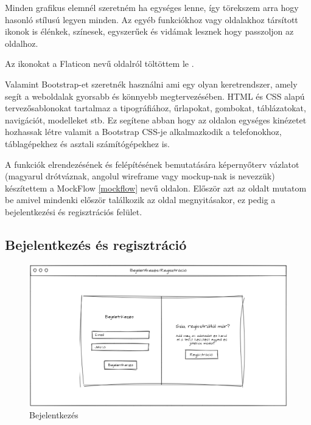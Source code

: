 Minden grafikus elemnél szeretném ha egységes lenne, így törekszem arra hogy hasonló stílusú legyen minden. Az egyéb funkciókhoz vagy oldalakhoz társított ikonok is élénkek, színesek, egyszerűek és vidámak lesznek hogy passzoljon az oldalhoz.

Az ikonokat a Flaticon nevű oldalról töltöttem le \cite{falcon}.

Valamint Bootstrap-et szeretnék használni ami egy olyan keretrendszer, amely segít a weboldalak gyorsabb és könnyebb megtervezésében. HTML és CSS alapú tervezősablonokat tartalmaz a tipográfiához, űrlapokat, gombokat, táblázatokat, navigációt, modelleket stb. Ez segítene abban hogy az oldalon egységes kinézetet hozhassak létre valamit a Bootstrap CSS-je alkalmazkodik a telefonokhoz, táblagépekhez és asztali számítógépekhez is.


A funkciók elrendezésének és felépítésének bemutatására képernyőterv vázlatot (magyarul drótváznak, angolul wireframe vagy mockup-nak is nevezzük) készítettem a MockFlow \ref{mockflow} nevű oldalon.
Először azt az oldalt mutatom be amivel mindenki először találkozik az oldal megnyitásakor, ez pedig a bejelentkezési és regisztrációs felület.

\subsection{Bejelentkezés és regisztráció}

\begin{figure}[H]
    \centering
    \includegraphics[width=\linewidth]{images/login_wireframe.png}
    \caption{Bejelentkezés}
    \label{fig:login_wireframe}
\end{figure}

